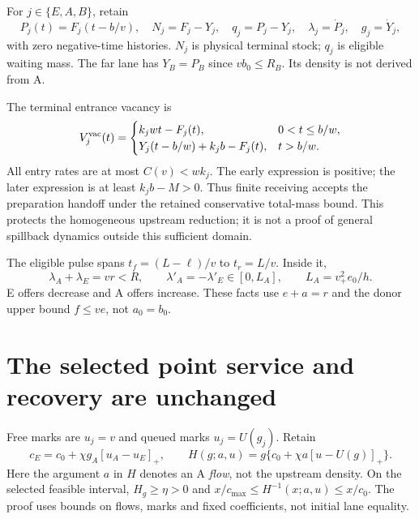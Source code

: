 \documentclass[11pt,a4paper]{article}
\newcommand{\pos}[1]{[#1]_+}
\begin{document}
For $j\in\{E,A,B\}$, retain
\begin{equation}
 P_j(t)=F_j(t-b/v),\quad N_j=F_j-Y_j,\quad q_j=P_j-Y_j,
 \quad \lambda_j=\dot P_j,\quad g_j=\dot Y_j,
 \label{eq:counts}
\end{equation}
with zero negative-time histories. $N_j$ is physical terminal stock;
$q_j$ is eligible waiting mass. The far lane has $Y_B=P_B$ since
$vb_0\leq R_B$. Its density is not derived from A.

The terminal entrance vacancy is
\begin{equation}
 V_j^{\rm vac}(t)=
 \begin{cases}k_jwt-F_j(t),&0<t\leq b/w,\\
 Y_j(t-b/w)+k_jb-F_j(t),&t>b/w.
 \end{cases} \label{eq:vacancy}
\end{equation}
All entry rates are at most $C(v)<wk_j$. The early expression is positive;
the later expression is at least $k_jb-M>0$. Thus finite receiving accepts
the preparation handoff under the retained conservative total-mass bound.
This protects the homogeneous upstream reduction; it is not a proof of
general spillback dynamics outside this sufficient domain.

The eligible pulse spans $t_f=(L-\ell)/v$ to $t_r=L/v$. Inside it,
\begin{equation}
 \lambda_A+\lambda_E=vr<R,\qquad
 \lambda'_A=-\lambda'_E\in[0,L_A],\qquad L_A=v_+^2e_0/h.
 \label{eq:pulse}
\end{equation}
E offers decrease and A offers increase. These facts use $e+a=r$ and the
donor upper bound $f\leq ve$, not $a_0=b_0$.

\section{The selected point service and recovery are unchanged}
Free marks are $u_j=v$ and queued marks $u_j=U(g_j)$. Retain
\begin{equation}
 c_E=c_0+\chi g_A\pos{u_A-u_E},\qquad
 H(g;a,u)=g\{c_0+\chi a\pos{u-U(g)}\}.
 \label{eq:root}
\end{equation}
Here the argument $a$ in $H$ denotes an A \emph{flow}, not the upstream
density. On the selected feasible interval, $H_g\geq\eta>0$ and
$x/c_{\max}\leq H^{-1}(x;a,u)\leq x/c_0$. The proof uses bounds on
flows, marks and fixed coefficients, not initial lane equality.
\end{document}
